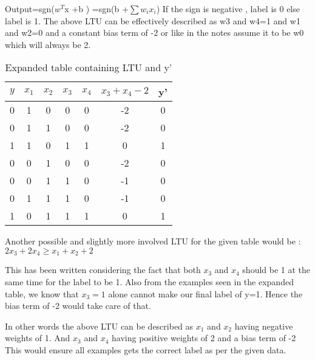 \documentclass[12pt, fullpage,letterpaper]{article}
\begin{document}
\begin{enumerate}
Output=sgn($w^{T} $x +b ) =sgn(b +$\sum w_ix_i$)
If the sign is negative , label is 0 else label is 1.
The above LTU can be effectively described as w3 and w4=1 and w1 and w2=0 and a constant bias term of -2 or like in the notes assume it to be w0 which will always be 2.

\begin{table}[h]
	\centering
	\begin{tabular}{|c|cccc|c|c|}
		\hline
		$y$  & $x_1$ & $x_2$  & $x_3$  & $x_4$ & $x_3 +x_4-2$ & y' \\
		\hline
		0  &  1    &  0     &  0     &  0  & -2  & 0    \\
		0  &  1    &  1     &  0     &  0   & -2  & 0     \\
		1  &  1    &  0     &  1     &  1   &  0  &  1    \\
		0  &  0    &  1     &  0     &  0   & -2  & 0     \\
		0  &  0    &  1     &  1     &  0   & -1  & 0     \\
		0  &  1    &  1     &  1     &  0   &  -1  & 0    \\
		1  &  0    &  1     &  1     &  1   & 0  & 1    \\
		\hline
	\end{tabular}
	\caption{Expanded table containing LTU and y'}
	\label{t3}
\end{table}

Another possible and slightly more involved LTU for the given table would be :
$2x_3 + 2x_4 \geq  x_1 +x_2+2$

This has been written considering the fact that both $x_3$ and $x_4$ should be 1 at the same time for the label to be 1. Also from the examples seen in the expanded table, we know that $x_3=1$ alone cannot make our final label of y=1. Hence the bias term of -2 would take care of that.

In other words the above LTU can be described as $x_1$ and $x_2$ having negative weights of 1. And $x_3$ and $x_4$ having positive weights of 2 and a bias term of -2 This would ensure all examples gets the correct label as per the given data.


\end{enumerate}
\end{document}
